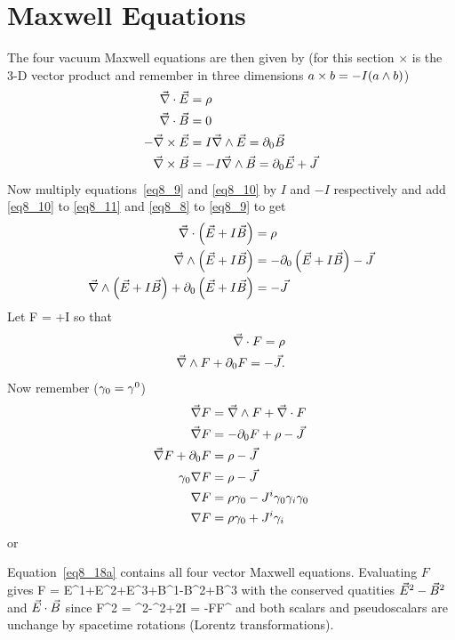 \section{Maxwell Equations}
The four vacuum Maxwell equations are then given by (for this section $\times$ is the 3-D vector product and remember in three dimensions $a\times b=-I(a\wedge b)$)
\begin{align}
	\vec{\nabla}\cdot\vec{E} &= \rho \label{eq8_8}\\
	\vec{\nabla}\cdot\vec{B} &= 0  \label{eq8_9}\\
	-\vec{\nabla}\times\vec{E} &= I\vec{\nabla}\wedge\vec{E} = \partial_{0}\vec{B} \label{eq8_10}\\
	\vec{\nabla}\times\vec{B} &= -I\vec{\nabla}\wedge\vec{B} = \partial_{0}\vec{E}+\vec{J} \label{eq8_11}
\end{align}
Now multiply equations~\ref{eq8_9} and \ref{eq8_10} by $I$ and $-I$ respectively and add \ref{eq8_10} to \ref{eq8_11} and \ref{eq8_8} to \ref{eq8_9} to get
\begin{align}
	\vec{\nabla}\cdot\left ( {\vec{E}+I\vec{B}} \right ) &= \rho \\
	\vec{\nabla}\wedge\left ( {\vec{E}+I\vec{B}} \right ) &= -\partial_{0}\left ( {\vec{E}+I\vec{B}} \right )-\vec{J} \\
	\vec{\nabla}\wedge\left ( {\vec{E}+I\vec{B}} \right )+\partial_{0}\left ( {\vec{E}+I\vec{B}} \right ) &= -\vec{J}
\end{align}
Let
\be
	F = \Ev+I\Bv
\ee
so that
\begin{align}
	\vec{\nabla}\cdot F = \rho \\
	\vec{\nabla}\wedge F+\partial_{0}F = -\vec{J}.
\end{align}
Now remember ($\gamma_{0}=\gamma^{0}$)
\begin{align}
 	\vec{\nabla} F &= \vec{\nabla}\wedge F+\vec{\nabla}\cdot F \nonumber \\
 	\vec{\nabla} F &= -\partial_{0}F+\rho-\vec{J} \nonumber \\
 	\vec{\nabla} F + \partial_{0}F &= \rho-\vec{J}  \nonumber \\
 	\gamma_{0}\nabla F &= \rho-\vec{J} \nonumber \\
 	\nabla F &= \rho\gamma_{0}-J^{i}\gamma_{0}\gamma_{i}\gamma_{0} \nonumber \\
	\nabla F &= \rho\gamma_{0}+J^{i}\gamma_{i}
\end{align}
or
\color{red}
\be
\ee
\normalcolor

Equation~\ref{eq8_18a} contains all four vector Maxwell equations.  Evaluating $F$ gives
\be
	F = E^{1}+E^{2}+E^{3}+B^{1}-B^{2}+B^{3}
\ee
with the conserved quatities $\vec{E}^{2}-\vec{B}^{2}$ and $\vec{E}\cdot\vec{B}$ since
\be
	F^{2} = \Ev^{2}-\Bv^{2}+2\paren{\Ev\cdot\Bv}I = -FF^{\R}
\ee
and both scalars and pseudoscalars are unchange by spacetime rotations (Lorentz transformations).

